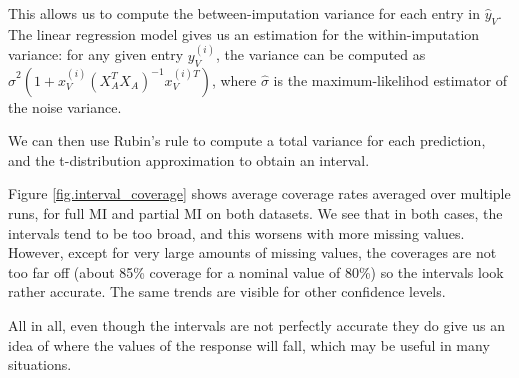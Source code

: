 This allows us to compute the between-imputation variance for each entry in $\hat{y}_V$. The linear regression model gives us an estimation for the within-imputation variance: for any given entry $y_V^{(i)}$, the variance can be computed as $\hat{\sigma}^2(1+x_V^{(i)} (X_A^T X_A)^{-1} x_V^{(i)T})$, where $\hat{\sigma}$ is the maximum-likelihod estimator of the noise variance.

 We can then use Rubin's rule  to compute a total variance for each prediction, and the t-distribution approximation to obtain an interval. 

Figure \ref{fig.interval_coverage} shows average coverage rates averaged over multiple runs, for full MI and partial MI on both datasets. We see that in both cases, the intervals tend to be too broad, and this worsens with more missing values. However, except for very large amounts of missing values, the coverages are not too far off (about 85\% coverage for a nominal value of 80\%) so the intervals look rather accurate. The same trends are visible for other confidence levels.



All in all, even though the intervals are not perfectly accurate they do give us an idea of where the values of the response will fall, which may be useful in many situations.